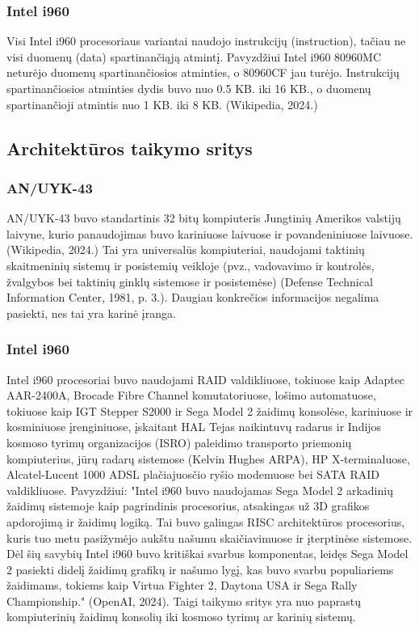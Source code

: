\documentclass{article}
\begin{document}
\subsubsection{Intel i960}
Visi Intel i960 procesoriaus variantai naudojo instrukcijų (instruction), tačiau ne visi duomenų (data) spartinančiąją atmintį. Pavyzdžiui Intel i960 80960MC neturėjo duomenų spartinančiosios atminties, o 80960CF jau turėjo. Instrukcijų spartinančiosios atminties dydis buvo nuo 0.5 KB. iki 16 KB., o duomenų spartinančioji atmintis nuo 1 KB. iki 8 KB. (Wikipedia, 2024.)
\subsection{Architektūros taikymo sritys}
\subsubsection{AN/UYK-43}
AN/UYK-43 buvo standartinis 32 bitų kompiuteris Jungtinių Amerikos valstijų laivyne, kurio panaudojimas buvo kariniuose laivuose ir povandeniniuose laivuose. (Wikipedia, 2024.) Tai yra universalūs kompiuteriai, naudojami taktinių skaitmeninių sistemų ir posistemių veikloje (pvz., vadovavimo ir kontrolės, žvalgybos bei taktinių ginklų sistemose ir posistemėse) (Defense Technical Information Center, 1981, p. 3.). Daugiau konkrečios informacijos negalima pasiekti, nes tai yra karinė įranga.
\subsubsection{Intel i960}
Intel i960 procesoriai buvo naudojami RAID valdikliuose, tokiuose kaip Adaptec AAR-2400A, Brocade Fibre Channel komutatoriuose, lošimo automatuose, tokiuose kaip IGT Stepper S2000 ir Sega Model 2 žaidimų konsolėse, kariniuose ir kosminiuose įrenginiuose, įskaitant HAL Tejas naikintuvų radarus ir Indijos kosmoso tyrimų organizacijos (ISRO) paleidimo transporto priemonių kompiuterius, jūrų radarų sistemose (Kelvin Hughes ARPA), HP X-terminaluose, Alcatel-Lucent 1000 ADSL plačiajuosčio ryšio modemuose bei SATA RAID valdikliuose. Pavyzdžiui: "Intel i960 buvo naudojamas Sega Model 2 arkadinių žaidimų sistemoje kaip pagrindinis procesorius, atsakingas už 3D grafikos apdorojimą ir žaidimų logiką. Tai buvo galingas RISC architektūros procesorius, kuris tuo metu pasižymėjo aukštu našumu skaičiavimuose ir įterptinėse sistemose. Dėl šių savybių Intel i960 buvo kritiškai svarbus komponentas, leidęs Sega Model 2 pasiekti didelį žaidimų grafikų ir našumo lygį, kas buvo svarbu populiariems žaidimams, tokiems kaip Virtua Fighter 2, Daytona USA ir Sega Rally Championship." (OpenAI, 2024). Taigi taikymo sritys yra nuo paprastų kompiuterinių žaidimų konsolių iki kosmoso tyrimų ar karinių sistemų.
\end{document}
